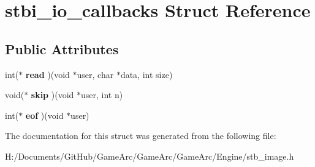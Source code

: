 \hypertarget{structstbi__io__callbacks}{\section{stbi\+\_\+io\+\_\+callbacks Struct Reference}
\label{structstbi__io__callbacks}
}
\subsection*{Public Attributes}
\begin{DoxyCompactItemize}
\item 
\hypertarget{structstbi__io__callbacks_a73818f0a4f467e5abfefb1d635f62d82}{int($\ast$ {\bfseries read} )(void $\ast$user, char $\ast$data, int size)}\label{structstbi__io__callbacks_a73818f0a4f467e5abfefb1d635f62d82}

\item 
\hypertarget{structstbi__io__callbacks_a864be557872041ac06e1509caf05cc83}{void($\ast$ {\bfseries skip} )(void $\ast$user, int n)}\label{structstbi__io__callbacks_a864be557872041ac06e1509caf05cc83}

\item 
\hypertarget{structstbi__io__callbacks_a2c4f3c3b7c75a2e74a35caf74fb8d177}{int($\ast$ {\bfseries eof} )(void $\ast$user)}\label{structstbi__io__callbacks_a2c4f3c3b7c75a2e74a35caf74fb8d177}

\end{DoxyCompactItemize}


The documentation for this struct was generated from the following file\+:\begin{DoxyCompactItemize}
\item 
H\+:/\+Documents/\+Git\+Hub/\+Game\+Arc/\+Game\+Arc/\+Game\+Arc/\+Engine/stb\+\_\+image.\+h\end{DoxyCompactItemize}
